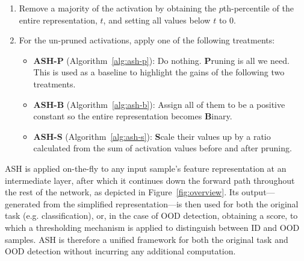 \documentclass{article}
\newcommand{\figref}[1]{Figure~\ref{fig:#1}}
\newcommand{\algoref}[1]{Algorithm~\ref{alg:#1}}
\newcommand{\ac}{ASH\xspace}
\begin{document}
\begin{enumerate}
    \item Remove a majority of the activation by obtaining the $p$th-percentile of the entire representation, $t$, and setting all values below $t$ to $0$.
    \item For the un-pruned activations, apply one of the following treatments:
    \begin{itemize}
        \item \textbf{ASH-P} (\algoref{ash-p}): Do nothing. \textbf{P}runing is all we need. This is used as a baseline to highlight the gains of the following two treatments. 
        \item \textbf{ASH-B} (\algoref{ash-b}): Assign all of them to be a positive constant so the entire representation becomes \textbf{B}inary.
        \item \textbf{ASH-S} (\algoref{ash-s}): \textbf{S}cale their values up by a ratio calculated from the sum of activation values before and after pruning.
    \end{itemize}
\end{enumerate}

\ac is applied on-the-fly to any input sample's feature representation at an intermediate layer, after which it continues down the forward path throughout the rest of the network, as depicted in \figref{overview}. Its output---generated from the simplified representation---is then used for both the original task (e.g. classification), or, in the case of OOD detection, obtaining a score, to which a thresholding mechanism is applied to distinguish between ID and OOD samples. \ac is therefore a unified framework for both the original task and OOD detection without incurring any additional computation.
\end{document}
